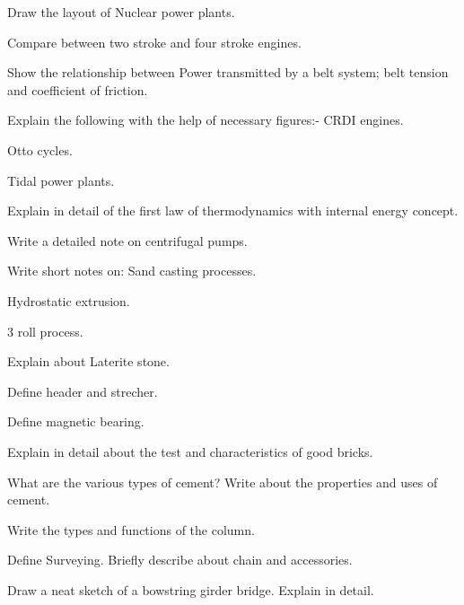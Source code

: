 \partBt

\item Draw the layout of Nuclear power plants.  
\item Compare between two stroke and four stroke engines. 
\item Show the relationship between Power transmitted by a belt system; belt tension and
  coefficient of friction.  

\partCo

\item \iitem Explain the following with the help of necessary figures:-
\iitem CRDI engines.
\item Otto cycles.
\item Tidal power plants.
\ene
\Or
\item Explain in detail of the first law of thermodynamics with internal energy concept.
\ene

\item \iitem Write a detailed note on centrifugal pumps.
\Or
\item Write short notes on:
\iitem Sand casting processes.
\item Hydrostatic extrusion.
\item 3 roll process.
\ene
\ene
\ene


\newpage

\sub{\subj}
\maxtime

\sectionall

\sectionA

\partA

\iitem Explain about Laterite stone. 
\item Define header and strecher. 
\item Define magnetic bearing. \marka

\partBt

\item Explain in detail about the test and characteristics of good bricks. 
\item What are the various types of cement? Write about the properties and uses of cement. 
\item Write the types and functions of the column. 
\partCo
\item \iitem Define Surveying. Briefly describe about chain and accessories.
\Or
\item Draw a neat sketch of a bowstring girder bridge. Explain in detail.

